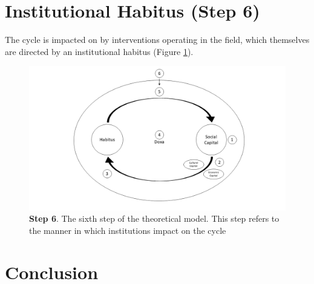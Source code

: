 \section{Institutional Habitus (Step 6)}
The cycle is impacted on by interventions operating in the field, which themselves are directed by an institutional habitus (Figure \ref{fig:TheoreticalModel6_C5}). 

\begin{figure}[ht]
\centering
\includegraphics[width=\textwidth]{C5 - Understanding Capital Accumulation/HabitusSocCap_TheoreticalModel.png}
\caption{\label{fig:TheoreticalModel6_C5}\textbf{Step 6}. The sixth step of the theoretical model. This step refers to the manner in which institutions impact on the cycle}
\end{figure}



\section{Conclusion}


